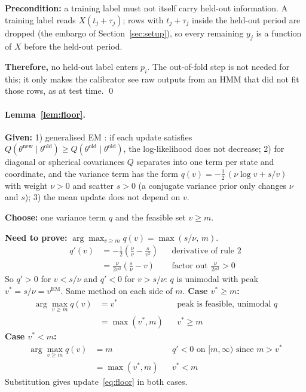 \documentclass{article}
\begin{document}
\textbf{Precondition:} a training label must not itself carry held-out information.
A training label reads $X(t_j+\tau_j)$; rows with $t_j+\tau_j$ inside the held-out period are dropped (the embargo of Section~\ref{sec:setup}), so every remaining $y_j$ is a function of $X$ before the held-out period.

\textbf{Therefore,} no held-out label enters $p_i$. The out-of-fold step is not needed for this; it only makes the calibrator see raw outputs from an HMM that did not fit those rows, as at test time. \qed

\paragraph{Lemma~\ref{lem:floor}.}
\textbf{Given:}
1) generalised EM \citep{dempster1977}: if each update satisfies $Q(\theta^{\text{new}}\mid\theta^{\text{old}})\ge Q(\theta^{\text{old}}\mid\theta^{\text{old}})$, the log-likelihood does not decrease;
2) for diagonal or spherical covariances $Q$ separates into one term per state and coordinate, and the variance term has the form $q(v)=-\tfrac12\,(\nu\log v + s/v)$ with weight $\nu>0$ and scatter $s>0$ (a conjugate variance prior only changes $\nu$ and $s$);
3) the mean update does not depend on $v$.

\textbf{Choose:} one variance term $q$ and the feasible set $v\ge m$.

\textbf{Need to prove:} $\arg\max_{v\ge m} q(v)=\max(s/\nu,\,m)$.
\begin{align*}
q'(v) &= -\tfrac12\left(\tfrac{\nu}{v}-\tfrac{s}{v^2}\right) && \text{derivative of rule 2}\\
      &= \tfrac{\nu}{2v^2}\left(\tfrac{s}{\nu}-v\right) && \text{factor out } \tfrac{\nu}{2v^2}>0
\end{align*}
So $q'>0$ for $v<s/\nu$ and $q'<0$ for $v>s/\nu$: $q$ is unimodal with peak $v^\ast=s/\nu=v^{\mathrm{EM}}$.
Same method on each side of $m$.
\textbf{Case $v^\ast\ge m$:}
\begin{align*}
\arg\max_{v\ge m} q(v) &= v^\ast && \text{peak is feasible, unimodal $q$}\\
                       &= \max(v^\ast,m) && v^\ast\ge m
\end{align*}
\textbf{Case $v^\ast<m$:}
\begin{align*}
\arg\max_{v\ge m} q(v) &= m && q'<0 \text{ on } [m,\infty) \text{ since } m>v^\ast\\
                       &= \max(v^\ast,m) && v^\ast<m
\end{align*}
Substitution gives update~\eqref{eq:floor} in both cases.
\end{document}
